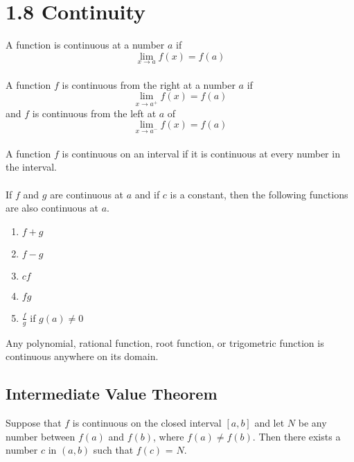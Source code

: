 %
%

\section*{1.8 Continuity}

A function is continuous at a number \(a\) if 
$$\lim_{x \to a}f(x) = f(a)$$\\
A function \(f\) is continuous from the right at a number \(a\) if 
$$\lim_{x \to a^+}f(x)=f(a)$$
and \(f\) is continuous from the left at \(a\) of 
$$\lim_{x \to a^-}f(x)=f(a)$$\\
A function \(f\) is continuous on an interval if it is continuous at every number in the interval.
\\\\
If \(f\) and \(g\) are continuous at \(a\) and if \(c\) is a constant, then the following functions are also continuous at \(a\).
\begin{enumerate}
    \item \(f + g\)
    \item \(f - g\)
    \item \(cf\)
    \item \(fg\)
    \item \(\frac{f}{g}\) if \(g(a) \neq 0\)
\end{enumerate}
Any polynomial, rational function, root function, or trigometric function is continuous anywhere on its domain.

\subsection*{Intermediate Value Theorem}

Suppose that \(f\) is continuous on the closed interval \([a, b]\) and let \(N\) be any number between \(f(a)\) and \(f(b)\), where \(f(a) \neq f(b)\). Then there exists a number \(c\) in \((a, b)\) such that \(f(c)\) = \(N\).
